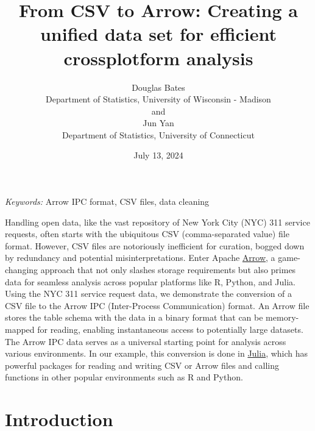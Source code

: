 \documentclass[
  12pt]{article}
\begin{document}
\def\spacingset#1{\renewcommand{\baselinestretch}%
{#1}\small\normalsize} \spacingset{1}



\date{July 13, 2024}
\title{\bf From CSV to Arrow: Creating a unified data set for efficient
crossplotform analysis}
\author{
Douglas Bates\\
Department of Statistics, University of Wisconsin - Madison\\
and\\Jun Yan\\
Department of Statistics, University of Connecticut\\
}
\maketitle

\bigskip
\bigskip
\begin{abstract}

\end{abstract}

\noindent%
{\it Keywords:} Arrow IPC format, CSV files, data cleaning
\vfill

\newpage
\spacingset{1.9} %


Handling open data, like the vast repository of New York City (NYC) 311
service requests, often starts with the ubiquitous CSV (comma-separated
value) file format. However, CSV files are notoriously inefficient for
curation, bogged down by redundancy and potential misinterpretations.
Enter Apache \href{https://arrow.apache.org}{Arrow}, a game-changing
approach that not only slashes storage requirements but also primes data
for seamless analysis across popular platforms like R, Python, and
Julia. Using the NYC 311 service request data, we demonstrate the
conversion of a CSV file to the Arrow IPC (Inter-Process Communication)
format. An Arrow file stores the table schema with the data in a binary
format that can be memory-mapped for reading, enabling instantaneous
access to potentially large datasets. The Arrow IPC data serves as a
universal starting point for analysis across various environments. In
our example, this conversion is done in
\href{https://julialang.org}{Julia}, which has powerful packages for
reading and writing CSV or Arrow files and calling functions in other
popular environments such as R and Python.

\section{Introduction}\label{sec-intro}
\end{document}
